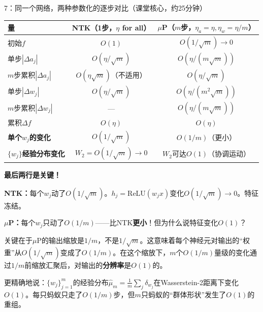 \documentclass[11pt,a4paper]{article}
\begin{document}
\begin{handcalc}{7：同一个网络，两种参数化的逐步对比（课堂核心，约25分钟）}
\begin{center}
\renewcommand{\arraystretch}{1.4}
\begin{tabular}{>{\raggedright}p{4.5cm}|c|c}
\toprule
\textbf{量} & \textbf{NTK}（1步，$\eta$ for all） & \textbf{$\mu$P}（$m$步，$\eta_a=\eta,\eta_w=\eta/m$） \\
\midrule
初始$f$ & $O(1)$ & $O(1/\sqrt{m})\to 0$ \\
\hline
单步$|\Delta a_j|$ & $O(\eta/\sqrt{m})$ & $O(\eta/(m\sqrt{m}))$ \\
$m$步累积$|\Delta a_j|$ & $O(\eta\sqrt{m})$（不适用） & $O(\eta/\sqrt{m})$ \\
\hline
单步$|\Delta w_j|$ & $O(\eta/\sqrt{m})$ & $O(\eta/(m^2\sqrt{m}))$ \\
$m$步累积$|\Delta w_j|$ & --- & $O(\eta/(m\sqrt{m}))$ \\
\hline
累积$\Delta f$ & $O(\eta)$ & $O(\eta)$ \\
\hline
\rowcolor{yellow!20}
\textbf{单个$w_j$的变化} & $O(1/\sqrt{m})$ & $O(1/m)$（更小） \\
\hline
\rowcolor{yellow!20}
\textbf{$\{w_j\}$经验分布变化} & $W_2=O(1/\sqrt{m})\to 0$ & $W_2$可达$O(1)$（协调运动） \\
\bottomrule
\end{tabular}
\end{center}

\bigskip
\textbf{最后两行是关键！}

\textbf{NTK：}每个$w_j$动了$O(1/\sqrt{m})$。$h_j=\text{ReLU}(w_j x)$变化$O(1/\sqrt{m})\to 0$。特征冻结。

\textbf{$\mu$P：}每个$w_j$只动了$O(1/m)$——比NTK\textbf{更小}！但为什么说特征变化$O(1)$？

关键在于$\mu$P的输出缩放是$1/m$，不是$1/\sqrt{m}$。这意味着每个神经元对输出的``权重''从$O(1/\sqrt{m})$变成了$O(1/m)$。在这个缩放下，$m$个$O(1/m)$量级的变化通过$1/m$前缩放汇聚后，对输出的\textbf{分辨率}是$O(1)$的。

更精确地说：$\{w_j\}_{j=1}^m$的经验分布$\hat\mu_m=\frac{1}{m}\sum_j\delta_{w_j}$在Wasserstein-2距离下变化$O(1)$。每只蚂蚁只走了$O(1/m)$步，但$m$只蚂蚁的``群体形状''发生了$O(1)$的重组。
\end{handcalc}
\end{document}
